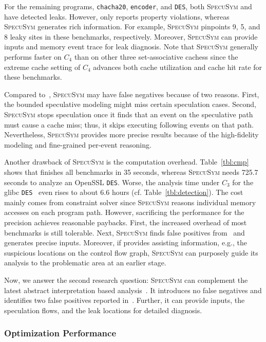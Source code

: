 \documentclass[sigconf,screen]{acmart}
\newcommand{\SpecuSym}{\textsc{SpecuSym} }
\begin{document}
For the remaining programs, \texttt{chacha20}, \texttt{encoder}, and \texttt{DES}, 
both \SpecuSym and~\cite{WuW19} have detected leaks. However, \cite{WuW19} only 
reports property violations, whereas \SpecuSym generates rich information. For 
example, \SpecuSym pinpoints 9, 5, and 8 leaky sites in these benchmarks, respectively. 
Moreover, \SpecuSym can provide inputs and memory event trace for leak diagnosis. 
Note that \SpecuSym generally performs faster on $C_4$ than on other three 
set-associative cachess since the extreme cache setting of $C_4$ advances both cache 
utilization and cache hit rate for these benchmarks. 


Compared to~\cite{WuW19}, \SpecuSym may have false negatives because of two reasons. 
First, the bounded speculative modeling might miss certain speculation cases. Second, 
\SpecuSym stops speculation once it finds that an event on the speculative path 
must cause a cache miss; thus, it skips executing following events on that path. 
Nevertheless, \SpecuSym provides more precise results because of the high-fidelity 
modeling and fine-grained per-event reasoning. 



Another drawback of \SpecuSym is the computation overhead. Table~\ref{tbl:cmp} shows 
that \cite{WuW19} finishes all benchmarks in 35 seconds, whereas \SpecuSym needs 
725.7 seconds to analyze an OpenSSL {\tt{DES}}. Worse, the analysis time under 
$C_3$ for the glibc \texttt{DES}~\cite{glibc} even rises to about 6.6 hours (cf.
Table~\ref{tbl:detection}). The cost mainly comes from constraint solver since 
\SpecuSym reasons individual memory accesses on each program path. However, 
sacrificing the performance for the precision achieves reasonable paybacks. First, 
the increased overhead of most benchmarks is still tolerable. Next, \SpecuSym finds 
false positives from~\cite{WuW19} and generates precise inputs. Moreover, if
\cite{WuW19} provides assisting information, e.g., the suspicious locations on the 
control flow graph, \SpecuSym can purposely guide its analysis to the problematic 
area at an earlier stage. 


Now, we answer the second research question: \SpecuSym can complement the latest 
abstract interpretation based analysis~\cite{WuW19}. It introduces no false negatives 
and identifies two false positives reported in~\cite{WuW19}. Further, it can provide
inputs, the speculation flows, and the leak locations for detailed diagnosis.


\subsubsection{Optimization Performance}
\label{sec:opt_perform}
\end{document}
